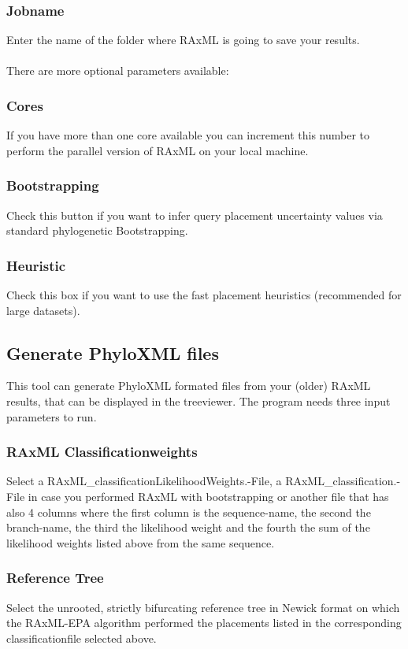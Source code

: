 \documentclass{article}
\begin{document}
		\subsubsection*{Jobname}
			Enter the name of the folder where RAxML is going to save your results. \\\\
	There are more optional parameters available:
		\subsubsection*{Cores}
			If you have more than one core available you can increment this number to perform the parallel version of RAxML on your local machine.
	 	\subsubsection*{Bootstrapping}
	 		Check this button if you want to infer query placement uncertainty values via standard phylogenetic Bootstrapping.
	 	\subsubsection*{Heuristic}
	  		Check this box if you want to use the fast placement heuristics (recommended for large datasets).	
		
	\subsection{Generate PhyloXML files}
		This tool can generate PhyloXML formated files from your (older) RAxML results, that can be displayed in the treeviewer. The program needs three input parameters to run.
		\subsubsection*{RAxML Classificationweights}
			Select a RAxML\_classificationLikelihoodWeights.-File, a RAxML\_classification.-File in case you performed RAxML with bootstrapping or another file that has also 4 columns where the first column is the sequence-name, the second the branch-name, the third the likelihood weight and the fourth the sum of the likelihood weights listed above from the same sequence.
		\subsubsection*{Reference Tree}
			Select the unrooted, strictly bifurcating reference tree in Newick format on which the RAxML-EPA algorithm performed the placements listed in the corresponding classificationfile selected above.
\end{document}
